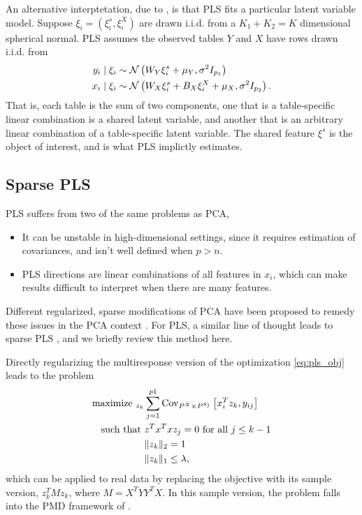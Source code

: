 \documentclass[14pt]{extarticle}
\begin{document}
An alternative interptetation, due to \citep{gustafsson2001probabilistic}, is
that PLS fits a particular latent variable model. Suppose $\xi_{i} =
\left(\xi_{i}^{s}, \xi_{i}^{X}\right)$ are drawn i.i.d. from a $K_{1} + K_{2} =
K$ dimensional spherical normal. PLS assumes the observed tables $Y$ and $X$
have rows drawn i.i.d. from
\begin{align*}
y_{i} \mid \xi_{i} &\sim \mathcal{N}\left(W_{Y}\xi_{i}^{s} +
\mu_{Y}, \sigma^{2}I_{p_{1}}\right) \\
x_{i} \mid \xi_{i} &\sim \mathcal{N}\left(W_{X} \xi_{i}^{s} + B_{X}\xi_{i}^{X} +
\mu_{X}, \sigma^{2}I_{p_{2}}\right).
\end{align*}
That is, each table is the sum of two components, one that is a
table-specific linear combination is a shared latent variable, and
another that is an arbitrary linear combination of a table-specific
latent variable. The shared feature $\xi^{s}$ is the object of
interest, and is what PLS implictly estimates.

\subsection{Sparse PLS}
\label{subsec:spls}

PLS suffers from two of the same problems as PCA,
\begin{itemize}
\item It can be unstable in high-dimensional settings, since it requires
  estimation of covariances, and isn't well defined when $p > n$.
\item PLS directions are linear combinations of all features in $x_i$, which can
  make results difficult to interpret when there are many features.
\end{itemize}

Different regularized, sparse modifications of PCA have been proposed to remedy
these issues in the PCA context \citep{zou2006sparse, witten2009penalized}. For
PLS, a similar line of thought leads to sparse PLS \citep{chun2010sparse}, and
we briefly review this method here.

Directly regularizing the multiresponse version of the
optimization \ref{eq:pls_obj} leads to the problem
\begin{align*}
  \text{maximize }_{z_k} &\sum_{j = 1}^{p1} \mathrm{Cov}_{P^X \times P^{y_j}}\left[{x_i^T z_k, y_{ij}}\right] \\
  \text{such that }&z^{T}x^{T}x z_{j} = 0 \text{ for all }j \leq k - 1 \\
  &\|z_k\|_2 = 1 \\
  &\|z_k\|_1 \leq \lambda,
\end{align*}
which can be applied to real data by replacing the objective with its sample
version, $z_k^{T} M z_k$, where $M = X^{T}YY^{T}X$. In this sample version, the
problem falls into the PMD framework of \citep{witten2009penalized}.
\end{document}
